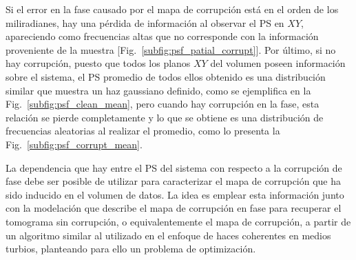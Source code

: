
\noindent Si el error en la fase causado por el mapa de corrupción está en el orden de los miliradianes, hay una pérdida de información al observar el PS en $XY$, apareciendo como frecuencias altas que no corresponde con la información proveniente de la muestra [Fig.~\ref{subfig:psf_patial_corrupt}]. Por último, si no hay corrupción, puesto que todos los planos $XY$ del volumen poseen información sobre el sistema, el PS promedio de todos ellos obtenido es una distribución similar que muestra un haz gaussiano definido, como se ejemplifica en la Fig.~\ref{subfig:psf_clean_mean}, pero cuando hay corrupción en la fase, esta relación se pierde completamente y lo que se obtiene es una distribución de frecuencias aleatorias al realizar el promedio, como lo presenta la Fig.~\ref{subfig:psf_corrupt_mean}.

La dependencia que hay entre el PS del sistema con respecto a la corrupción de fase debe ser posible de utilizar para caracterizar el mapa de corrupción que ha sido inducido en el volumen de datos. La idea es emplear esta información junto con la modelación que describe el mapa de corrupción en fase para recuperar el tomograma sin corrupción, o equivalentemente el mapa de corrupción, a partir de un algoritmo similar al utilizado en el enfoque de haces coherentes en medios turbios, planteando para ello un problema de optimización.


